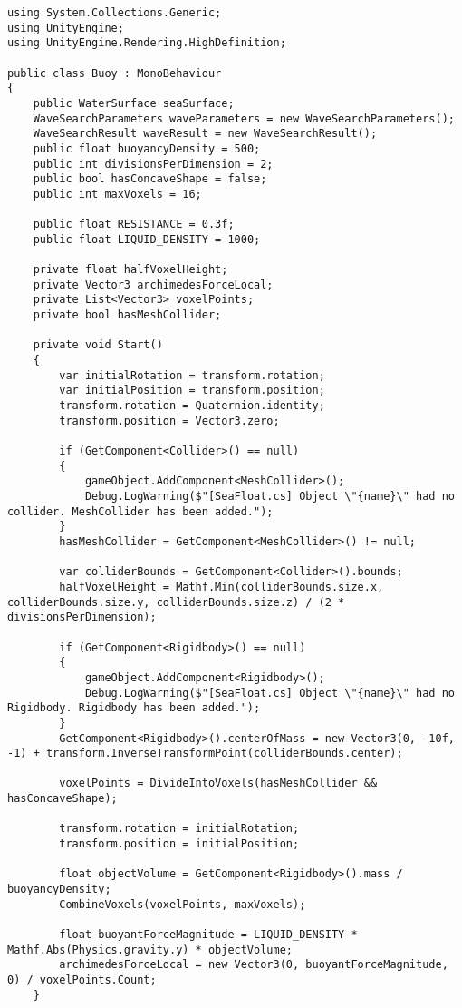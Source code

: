 \begin{lstlisting}
using System.Collections.Generic;
using UnityEngine;
using UnityEngine.Rendering.HighDefinition;

public class Buoy : MonoBehaviour
{
    public WaterSurface seaSurface;
    WaveSearchParameters waveParameters = new WaveSearchParameters();
    WaveSearchResult waveResult = new WaveSearchResult();
    public float buoyancyDensity = 500;
    public int divisionsPerDimension = 2;
    public bool hasConcaveShape = false;
    public int maxVoxels = 16;

    public float RESISTANCE = 0.3f;
    public float LIQUID_DENSITY = 1000;

    private float halfVoxelHeight;
    private Vector3 archimedesForceLocal;
    private List<Vector3> voxelPoints;
    private bool hasMeshCollider;

    private void Start()
    {
        var initialRotation = transform.rotation;
        var initialPosition = transform.position;
        transform.rotation = Quaternion.identity;
        transform.position = Vector3.zero;

        if (GetComponent<Collider>() == null)
        {
            gameObject.AddComponent<MeshCollider>();
            Debug.LogWarning($"[SeaFloat.cs] Object \"{name}\" had no collider. MeshCollider has been added.");
        }
        hasMeshCollider = GetComponent<MeshCollider>() != null;

        var colliderBounds = GetComponent<Collider>().bounds;
        halfVoxelHeight = Mathf.Min(colliderBounds.size.x, colliderBounds.size.y, colliderBounds.size.z) / (2 * divisionsPerDimension);

        if (GetComponent<Rigidbody>() == null)
        {
            gameObject.AddComponent<Rigidbody>();
            Debug.LogWarning($"[SeaFloat.cs] Object \"{name}\" had no Rigidbody. Rigidbody has been added.");
        }
        GetComponent<Rigidbody>().centerOfMass = new Vector3(0, -10f, -1) + transform.InverseTransformPoint(colliderBounds.center);

        voxelPoints = DivideIntoVoxels(hasMeshCollider && hasConcaveShape);

        transform.rotation = initialRotation;
        transform.position = initialPosition;

        float objectVolume = GetComponent<Rigidbody>().mass / buoyancyDensity;
        CombineVoxels(voxelPoints, maxVoxels);

        float buoyantForceMagnitude = LIQUID_DENSITY * Mathf.Abs(Physics.gravity.y) * objectVolume;
        archimedesForceLocal = new Vector3(0, buoyantForceMagnitude, 0) / voxelPoints.Count;
    }


\end{lstlisting}
